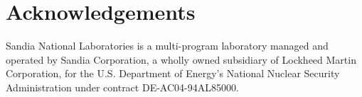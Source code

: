 \chapter*{Acknowledgements}

Sandia National Laboratories is a multi-program laboratory managed and operated by Sandia 
Corporation, a wholly owned subsidiary of Lockheed Martin Corporation, for the U.S. 
Department of Energy's National Nuclear Security Administration under contract DE-AC04-94AL85000.

